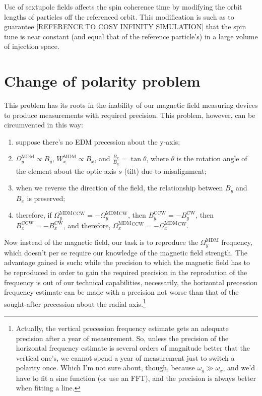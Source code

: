 \documentclass{article}
\newcommand{\W}{\Omega}
\newcommand{\w}{\omega}
\newcommand{\MDM}{^\mathrm{MDM}}
\newcommand{\CW}{^\mathrm{CW}}
\newcommand{\CCW}{^\mathrm{CCW}}
\begin{document}
Use of sextupole fields affects the spin coherence time by modifying the orbit lengths of particles off the referenced orbit. This modification is such as to guarantee [REFERENCE TO COSY INFINITY SIMULATION] that the spin tune is near constant (and equal that of the reference particle's) in a large volume of injection space.

\section{Change of polarity problem}
This problem has its roots in the inability of our magnetic field measuring devices to produce measurements with required precision. This problem, however, can be circumvented in this way:
\begin{enumerate}
\item suppose there's no EDM precession about the y-axis;
\item $\W_y\MDM\propto B_y$, $W_x\MDM\propto B_x$, and $\frac{B_x}{B_y} = \tan\theta$, where $\theta$ is the rotation angle of the element about the optic axis $s$ (tilt) due to misalignment;
\item when we reverse the direction of the field, the relationship between $B_y$ and $B_x$ is preserved;
\item therefore, if $\W_y\MDM\CCW = -\W_y\MDM\CW$, then $B_y\CCW = -B_y\CW$, then $B_x\CCW = -B_x\CW$, and therefore, $\W_x\MDM\CCW = -\W_x\MDM\CW$.
\end{enumerate}

Now instead of the magnetic field, our task is to reproduce the $\W_y\MDM$ frequency, which doesn't per se require our knowledge of the magnetic field strength. The advantage gained is such: while the precision to which the magnetic field has to be reproduced in order to gain the required precision in the reprodution of the frequency is out of our technical capabilities, necessarily, the horizontal precession frequency estimate can be made with a precision not worse than that of the sought-after precession about the radial axis.\footnote{Actually, the vertical precession frequency estimate gets an adequate precision after a year of measurement. So, unless the precision of the horizontal frequency estimate is several orders of magnitude better that the vertical one's, we cannot spend a year of measurement just to switch a polarity once. Which I'm not sure about, though, because $\w_y \gg \w_x$, and we'd have to fit a sine function (or use an FFT), and the precision is always better when fitting a line.}
\end{document}

